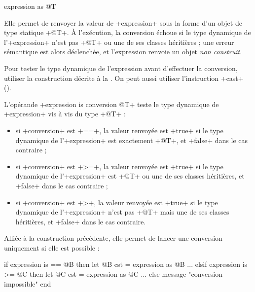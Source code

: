 \begin{galgasbox}
expression as @T
\end{galgasbox}

Elle permet de renvoyer la valeur de \ggs+expression+ sous la forme d'un objet de type statique \ggs+@T+. À l'exécution, la conversion échoue si le type dynamique de l'\ggs+expression+ n'est pas \ggs+@T+ ou une de ses classes héritières ; une erreur sémantique est alors déclenchée, et l'expression renvoie un objet \emph{non construit}.

Pour tester le type dynamique de l'expression avant d'effectuer la conversion, utiliser la construction décrite à la . On peut aussi utiliser l'instruction \ggs+cast+ ().








L'opérande \ggs+expression is conversion @T+ teste le type dynamique de \ggs+expression+ vis à vis du type \ggs+@T+ :
\begin{itemize}
\item si \ggs+conversion+ est \ggs+==+, la valeur renvoyée est \ggs+true+ si le type dynamique de l'\ggs+expression+ est exactement \ggs+@T+, et \ggs+false+ dans le cas contraire ;
\item si \ggs+conversion+ est  \ggs+>=+, la valeur renvoyée est \ggs+true+ si le type dynamique de l'\ggs+expression+ est \ggs+@T+ ou une de ses classes héritières, et \ggs+false+ dans le cas contraire ;
\item si \ggs+conversion+ est  \ggs+>+, la valeur renvoyée est \ggs+true+ si le type dynamique de l'\ggs+expression+ n'est pas \ggs+@T+ mais une de ses classes héritières, et \ggs+false+ dans le cas contraire.
\end{itemize}



Alliée à la construction précédente, elle permet de lancer une conversion uniquement si elle est possible :

\begin{galgas}
if expression is == @B then
  let @B cst = expression as @B
  ...
elsif expression is >= @C then
  let @C cst = expression as @C
  ...
else
  message "conversion impossible"
end
\end{galgas}





